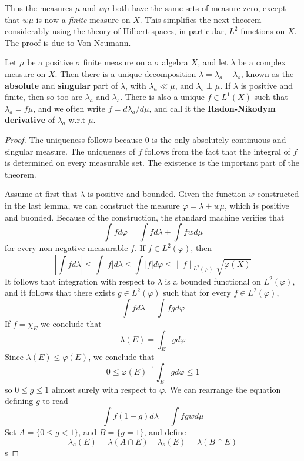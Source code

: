Thus the measures $\mu$ and $w\mu$ both have the same sets of measure zero, except that $w\mu$ is now a {\it finite} measure on $X$. This simplifies the next theorem considerably using the theory of Hilbert spaces, in particular, $L^2$ functions on $X$. The proof is due to Von Neumann.

\begin{theorem}
    Let $\mu$ be a positive $\sigma$ finite measure on a $\sigma$ algebra $X$, and let $\lambda$ be a complex measure on $X$. Then there is a unique decomposition $\lambda = \lambda_a + \lambda_s$, known as the {\bf absolute} and {\bf singular} part of $\lambda$, with $\lambda_a \ll \mu$, and $\lambda_s \perp \mu$. If $\lambda$ is positive and finite, then so too are $\lambda_a$ and $\lambda_s$. There is also a unique $f \in L^1(X)$ such that $\lambda_a = f\mu$, and we often write $f = d\lambda_a/d\mu$, and call it the {\bf Radon-Nikodym derivative} of $\lambda_a$ w.r.t $\mu$.
\end{theorem}
\begin{proof}
    The uniqueness follows because $0$ is the only absolutely continuous and singular measure. The uniqueness of $f$ follows from the fact that the integral of $f$ is determined on every measurable set. The existence is the important part of the theorem.

    Assume at first that $\lambda$ is positive and bounded. Given the function $w$ constructed in the last lemma, we can construct the measure $\varphi = \lambda + w\mu$, which is positive and buonded. Because of the construction, the standard machine verifies that
    \[ \int f d\varphi = \int fd\lambda + \int fw d\mu \]
    for every non-negative measurable $f$. If $f \in L^2(\varphi)$, then
    \[ \left| \int f d\lambda \right| \leq \int |f| d\lambda \leq \int |f| d\varphi \leq \| f \|_{L^2(\varphi)} \sqrt{\varphi(X)} \]
    It follows that integration with respect to $\lambda$ is a bounded functional on $L^2(\varphi)$, and it follows that there exists $g \in L^2(\varphi)$ such that for every $f \in L^2(\varphi)$,
    \[ \int f d\lambda = \int fg d\varphi \]
    If $f = \chi_E$ we conclude that
    \[ \lambda(E) = \int_E gd\varphi \]
    Since $\lambda(E) \leq \varphi(E)$, we conclude that
    \[ 0 \leq \varphi(E)^{-1} \int_E gd\varphi \leq 1 \]
    so $0 \leq g \leq 1$ almost surely with respect to $\varphi$. We can rearrange the equation defining $g$ to read
    \[ \int f(1-g) d\lambda = \int fgw d\mu \]
    Set $A = \{ 0 \leq g < 1 \}$, and $B = \{ g = 1 \}$, and define
    \[ \lambda_a(E) = \lambda(A \cap E)\ \ \ \ \ \lambda_s(E) = \lambda(B \cap E) \]
    s
\end{proof}













